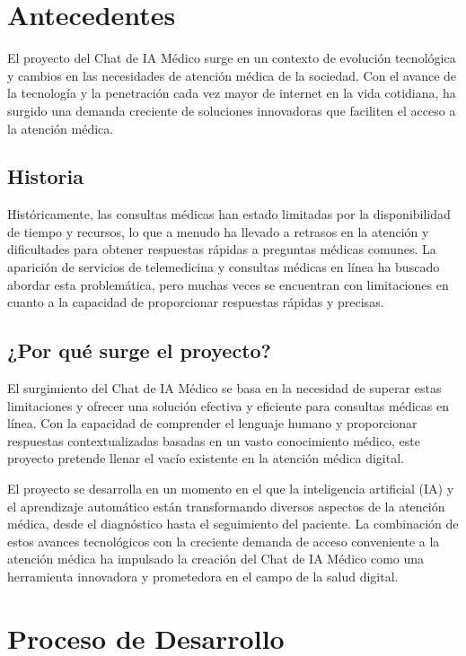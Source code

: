 \documentclass[conference]{IEEEtran}
\begin{document}
\section{Antecedentes}

El proyecto del Chat de IA Médico surge en un contexto de evolución tecnológica y cambios en las necesidades de atención médica de la sociedad. Con el avance de la tecnología y la penetración cada vez mayor de internet en la vida cotidiana, ha surgido una demanda creciente de soluciones innovadoras que faciliten el acceso a la atención médica.

\subsection{Historia}

Históricamente, las consultas médicas han estado limitadas por la disponibilidad de tiempo y recursos, lo que a menudo ha llevado a retrasos en la atención y dificultades para obtener respuestas rápidas a preguntas médicas comunes. La aparición de servicios de telemedicina y consultas médicas en línea ha buscado abordar esta problemática, pero muchas veces se encuentran con limitaciones en cuanto a la capacidad de proporcionar respuestas rápidas y precisas.

\subsection{¿Por qué surge el proyecto?}

El surgimiento del Chat de IA Médico se basa en la necesidad de superar estas limitaciones y ofrecer una solución efectiva y eficiente para consultas médicas en línea. Con la capacidad de comprender el lenguaje humano y proporcionar respuestas contextualizadas basadas en un vasto conocimiento médico, este proyecto pretende llenar el vacío existente en la atención médica digital.

El proyecto se desarrolla en un momento en el que la inteligencia artificial (IA) y el aprendizaje automático están transformando diversos aspectos de la atención médica, desde el diagnóstico hasta el seguimiento del paciente. La combinación de estos avances tecnológicos con la creciente demanda de acceso conveniente a la atención médica ha impulsado la creación del Chat de IA Médico como una herramienta innovadora y prometedora en el campo de la salud digital.

\section{Proceso de Desarrollo}
\end{document}
